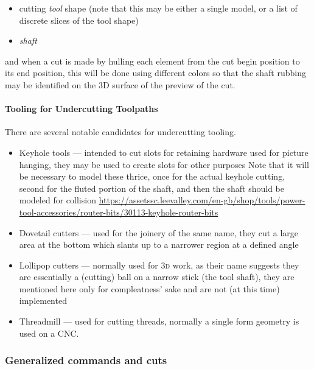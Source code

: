 \documentclass{ltxdoc}
\begin{document}
\begin{itemize}
\item cutting \emph{tool} shape (note that this may be either a single model, or a list of discrete slices of the tool shape)
\item \emph{shaft}
\end{itemize}

\noindent and when a cut is made by hulling each element from the cut begin position to its end position, this will be done using different colors so that the shaft rubbing may be identified on the 3D surface of the preview of the cut.

\paragraph{Tooling for Undercutting Toolpaths}

There are several notable candidates for under\-cutting tooling. \label{para:undercuttooling} 

\begin{itemize}
\item Keyhole tools --- intended to cut slots for retaining hardware used for picture
                        hanging, they may be used to create slots for other purposes
                        Note that it will be necessary to model these thrice, once for
                        the actual keyhole cutting, second for the fluted portion of
                        the shaft, and then the shaft should be modeled for collision
                        \url{https://assetssc.leevalley.com/en-gb/shop/tools/power-tool-accessories/router-bits/30113-keyhole-router-bits} 
\item Dovetail cutters --- used for the joinery of the same name, they cut a large
                           area at the bottom which slants up to a narrower region
                           at a defined angle
\item Lollipop cutters --- normally used for \textsc{3d} work, as their name suggests
                           they are essentially a (cutting) ball on a narrow stick
                           (the tool shaft), they are mentioned here only for
                           compleatness' sake and are not (at this time) implemented
\item Threadmill --- used for cutting threads, normally a single form geometry is
                     used on a CNC.
\end{itemize}

\subsubsection{Generalized commands and cuts}
\end{document}
